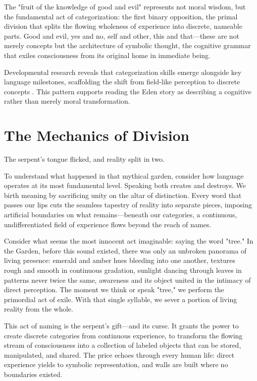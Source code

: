 The "fruit of the knowledge of good and evil" represents not moral wisdom, but the fundamental act of categorization: the first binary opposition, the primal division that splits the flowing wholeness of experience into discrete, nameable parts. Good and evil, yes and no, self and other, this and that—these are not merely concepts but the architecture of symbolic thought, the cognitive grammar that exiles consciousness from its original home in immediate being.

Developmental research reveals that categorization skills emerge alongside key language milestones, scaffolding the shift from field-like perception to discrete concepts \parencite{tomasello2008origins,deacon1997symbolic}. This pattern supports reading the Eden story as describing a cognitive rather than merely moral transformation.

\section{The Mechanics of Division}

The serpent's tongue flicked, and reality split in two.

To understand what happened in that mythical garden, consider how language operates at its most fundamental level. Speaking both creates and destroys. We birth meaning by sacrificing unity on the altar of distinction. Every word that passes our lips cuts the seamless tapestry of reality into separate pieces, imposing artificial boundaries on what remains—beneath our categories, a continuous, undifferentiated field of experience flows beyond the reach of names.

Consider what seems the most innocent act imaginable: saying the word "tree." In the Garden, before this sound existed, there was only an unbroken panorama of living presence: emerald and amber hues bleeding into one another, textures rough and smooth in continuous gradation, sunlight dancing through leaves in patterns never twice the same, awareness and its object united in the intimacy of direct perception. The moment we think or speak "tree," we perform the primordial act of exile. With that single syllable, we sever a portion of living reality from the whole.

This act of naming is the serpent's gift—and its curse. It grants the power to create discrete categories from continuous experience, to transform the flowing stream of consciousness into a collection of labeled objects that can be stored, manipulated, and shared. The price echoes through every human life: direct experience yields to symbolic representation, and walls are built where no boundaries existed.

